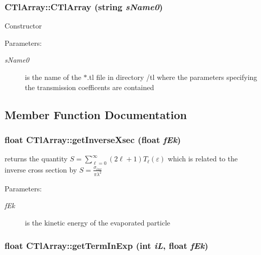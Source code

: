 \subsubsection{\setlength{\rightskip}{0pt plus 5cm}CTl\-Array::CTl\-Array (string {\em s\-Name0})}\label{classCTlArray_2da7e96c7b1c0e751799cc2efa35440e}


Constructor \begin{Desc}
\item[Parameters:]
\begin{description}
\item[{\em s\-Name0}]is the name of the $\ast$.tl file in directory /tl where the parameters specifying the transmission coefficents are contained \end{description}
\end{Desc}


\subsection{Member Function Documentation}
\subsubsection{\setlength{\rightskip}{0pt plus 5cm}float CTl\-Array::get\-Inverse\-Xsec (float {\em f\-Ek})}\label{classCTlArray_b9a9ae1a39619e3a2836b2001dcb39ba}


returns the quantity $S=\sum_{\ell=0}^{\infty} (2\ell+1)T_{\ell}(\varepsilon)$ which is related to the inverse cross section by $S=\frac{\sigma_{inv}}{\pi\lambda^{2}}$ \begin{Desc}
\item[Parameters:]
\begin{description}
\item[{\em f\-Ek}]is the kinetic energy of the evaporated particle \end{description}
\end{Desc}
\subsubsection{\setlength{\rightskip}{0pt plus 5cm}float CTl\-Array::get\-Term\-In\-Exp (int {\em i\-L}, float {\em f\-Ek})}\label{classCTlArray_b3722411ddf490b7057cd8df907bf559}


